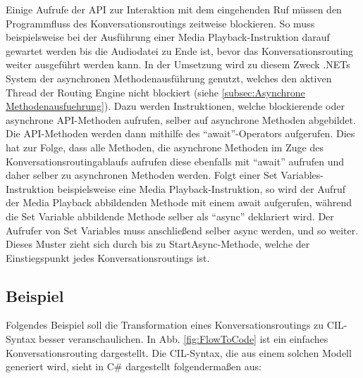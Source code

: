 Einige Aufrufe der API zur Interaktion mit dem eingehenden Ruf müssen den Programmfluss des Konversationsroutings zeitweise blockieren. So muss beispielsweise bei der Ausführung einer Media Playback-Instruktion darauf gewartet werden bis die Audiodatei zu Ende ist, bevor das Konversationsrouting weiter ausgeführt werden kann. In der Umsetzung wird zu diesem Zweck .NETs System der asynchronen Methodenausführung genutzt, welches den aktiven Thread der Routing Engine nicht blockiert (siehe \ref{subsec:Asynchrone Methodenausfuehrung}). Dazu werden Instruktionen, welche blockierende oder asynchrone API-Methoden aufrufen, selber auf asynchrone Methoden abgebildet. Die API-Methoden werden dann mithilfe des ``await''-Operators aufgerufen. Dies hat zur Folge, dass alle Methoden, die asynchrone Methoden im Zuge des Konversationsroutingablaufs aufrufen diese ebenfalls mit ``await'' aufrufen und daher selber zu asynchronen Methoden werden. Folgt einer Set Variables-Instruktion beispielsweise eine Media Playback-Instruktion, so wird der Aufruf der Media Playback abbildenden Methode mit einem await aufgerufen, während die Set Variable abbildende Methode selber als ``async'' deklariert wird. Der Aufrufer von Set Variables muss anschließend selber async werden, und so weiter. Dieses Muster zieht sich durch bis zu StartAsync-Methode, welche der Einstiegspunkt jedes Konversationsroutings ist.

\subsection{Beispiel}
\label{subsec:Beispiel}
Folgendes Beispiel soll die Transformation eines Konversationsroutings zu CIL-Syntax besser veranschaulichen. In Abb. \ref{fig:FlowToCode} ist ein einfaches Konversationsrouting dargestellt. Die CIL-Syntax, die aus einem solchen Modell generiert wird, sieht in C\# dargestellt folgendermaßen aus:



